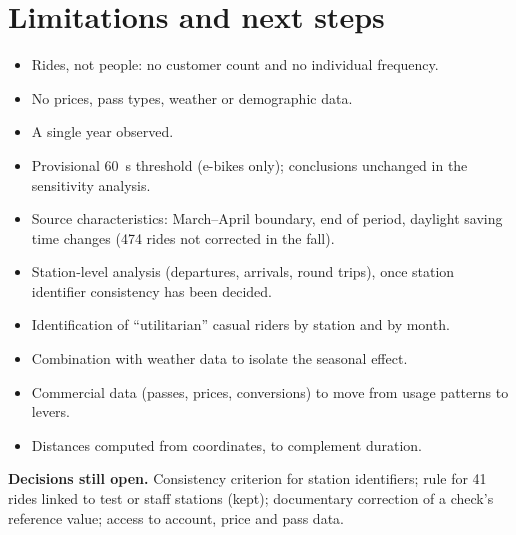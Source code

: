 \section{Limitations and next steps}
\label{sec:limitations}

\begin{minipage}[t]{0.485\linewidth}
\begin{keyboxfixed}[Limitations]\raggedright
\setlength{\parskip}{0pt}\begin{itemize}[leftmargin=1.1em, topsep=2pt, itemsep=3pt, parsep=0pt]
  \item Rides, not people: no customer count and no individual frequency.
  \item No prices, pass types, weather or demographic data.
  \item A single year observed.
  \item Provisional 60~s threshold (e-bikes only); conclusions unchanged in the sensitivity analysis.
  \item Source characteristics: March--April boundary, end of period, daylight saving time changes (474 rides not corrected in the fall).
\end{itemize}
\end{keyboxfixed}
\end{minipage}\hfill
\begin{minipage}[t]{0.485\linewidth}
\begin{keyboxfixed}\raggedright
\setlength{\parskip}{0pt}\begin{itemize}[leftmargin=1.1em, topsep=2pt, itemsep=3pt, parsep=0pt]
  \item Station-level analysis (departures, arrivals, round trips), once station identifier consistency has been decided.
  \item Identification of ``utilitarian'' casual riders by station and by month.
  \item Combination with weather data to isolate the seasonal effect.
  \item Commercial data (passes, prices, conversions) to move from usage patterns to levers.
  \item Distances computed from coordinates, to complement duration.
\end{itemize}
\end{keyboxfixed}
\end{minipage}

\medskip
\textbf{Decisions still open.} Consistency criterion for station identifiers; rule for 41 rides linked to test or staff stations (kept); documentary correction of a check's reference value; access to account, price and pass data.
